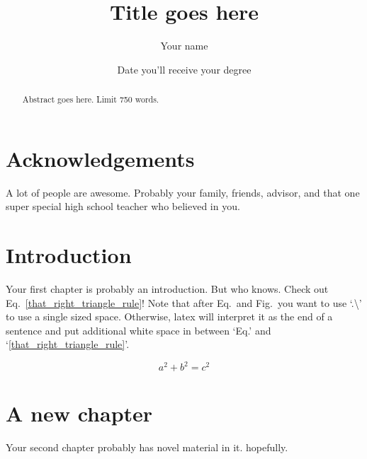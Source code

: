 \documentclass[letterpaper,12pt,draft]{yalephd}
\begin{document}
\title{Title goes here}
\author{Your name}
\date{Date you'll receive your degree} %

\frontmatter

\begin{abstract}
Abstract goes here. Limit 750 words.
\end{abstract}


\maketitle
{}
\tableofcontents
\listoffigures %
\listoftables %

\chapter{Acknowledgements} %
A lot of people are awesome. Probably your family, friends, 
advisor, and that one super special high school teacher who
believed in you.

\mainmatter

\chapter{Introduction}
Your first chapter is probably an introduction. But who knows. Check out Eq.\ \ref{that_right_triangle_rule}!
Note that after Eq.\ and Fig.\ you want to use `.\textbackslash'  to use a single sized space. Otherwise,
latex will interpret it as the end of a sentence and put additional white space in between `Eq.' and 
`\ref{that_right_triangle_rule}'.

\begin{equation}
a^2 + b^2 = c^2 \label{that_right_triangle_rule}
\end{equation}

\chapter{A new chapter}
Your second chapter probably has novel material in it. hopefully.

\end{document}
